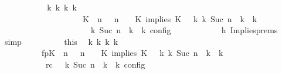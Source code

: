 \begin{isabellebody}
\ \ \ \ \ \ \ \ \isamarkupfalse%
\ \isamarkupfalse%
\ {\isacartoucheopen}{\isasymexists}{\isasymGamma}\isactrlsub k\ {\isasymPsi}\isactrlsub k\ {\isasymPhi}\isactrlsub k\ k{\isachardot}\isanewline
\ \ \ \ \ \ \ \ \ \ \ \ \ \ \ \ \ \ \ \ {\isacharparenleft}{\isacharparenleft}{\isacharparenleft}{\isacharparenleft}K\ {\isasymnot}{\isasymUp}\ n{\isacharparenright}\ {\isacharhash}\ {\isasymGamma}{\isacharparenright}{\isacharcomma}\ n\ {\isasymturnstile}\ {\isasymPsi}\ {\isasymtriangleright}\ {\isacharparenleft}{\isacharparenleft}K\ implies\ K\ {\isacharhash}\ {\isasymPhi}{\isacharparenright}{\isacharparenright}\ {\isasymhookrightarrow}\isactrlbsup k\isactrlesup \ {\isacharparenleft}{\isasymGamma}\isactrlsub k{\isacharcomma}\ Suc\ n\ {\isasymturnstile}\ {\isasymPsi}\isactrlsub k\ {\isasymtriangleright}\ {\isasymPhi}\isactrlsub k{\isacharparenright}{\isacharparenright}\isanewline
\ \ \ \ \ \ \ \ \ \ \ \ \ \ \ \ \ \ {\isasymand}\ {\isasymrho}\ {\isasymin}\ {\isasymlbrakk}\ {\isasymGamma}\isactrlsub k{\isacharcomma}\ Suc\ n\ {\isasymturnstile}\ {\isasymPsi}\isactrlsub k\ {\isasymtriangleright}\ {\isasymPhi}\isactrlsub k\ {\isasymrbrakk}\isactrlsub c\isactrlsub o\isactrlsub n\isactrlsub f\isactrlsub i\isactrlsub g{\isacartoucheclose}\isanewline
\ \ \ \ \ \ \ \ \ \ \isamarkupfalse%
\ h{}\ Implies{\isachardot}prems\ \isamarkupfalse%
\ simp\isanewline
\ \ \ \ \ \ \ \ \isamarkupfalse%
\ this\ \isamarkupfalse%
\ {\isasymGamma}\isactrlsub k\ {\isasymPsi}\isactrlsub k\ {\isasymPhi}\isactrlsub k\ k\ \isanewline
\ \ \ \ \ \ \ \ \ \ fp{\isacharcolon}{\isacartoucheopen}{\isacharparenleft}{\isacharparenleft}{\isacharparenleft}{\isacharparenleft}K\ {\isasymnot}{\isasymUp}\ n{\isacharparenright}\ {\isacharhash}\ {\isasymGamma}{\isacharparenright}{\isacharcomma}\ n\ {\isasymturnstile}\ {\isasymPsi}\ {\isasymtriangleright}\ {\isacharparenleft}{\isacharparenleft}K\ implies\ K\ {\isacharhash}\ {\isasymPhi}{\isacharparenright}{\isacharparenright}\ {\isasymhookrightarrow}\isactrlbsup k\isactrlesup \ {\isacharparenleft}{\isasymGamma}\isactrlsub k{\isacharcomma}\ Suc\ n\ {\isasymturnstile}\ {\isasymPsi}\isactrlsub k\ {\isasymtriangleright}\ {\isasymPhi}\isactrlsub k{\isacharparenright}{\isacharparenright}{\isacartoucheclose}\isanewline
\ \ \ \ \ \ \ \ \ \ \ rc{\isacharcolon}{\isacartoucheopen}{\isasymrho}\ {\isasymin}\ {\isasymlbrakk}\ {\isasymGamma}\isactrlsub k{\isacharcomma}\ Suc\ n\ {\isasymturnstile}\ {\isasymPsi}\isactrlsub k\ {\isasymtriangleright}\ {\isasymPhi}\isactrlsub k\ {\isasymrbrakk}\isactrlsub c\isactrlsub o\isactrlsub n\isactrlsub f\isactrlsub i\isactrlsub g{\isacartoucheclose}\ \isamarkupfalse%

\end{isabellebody}
